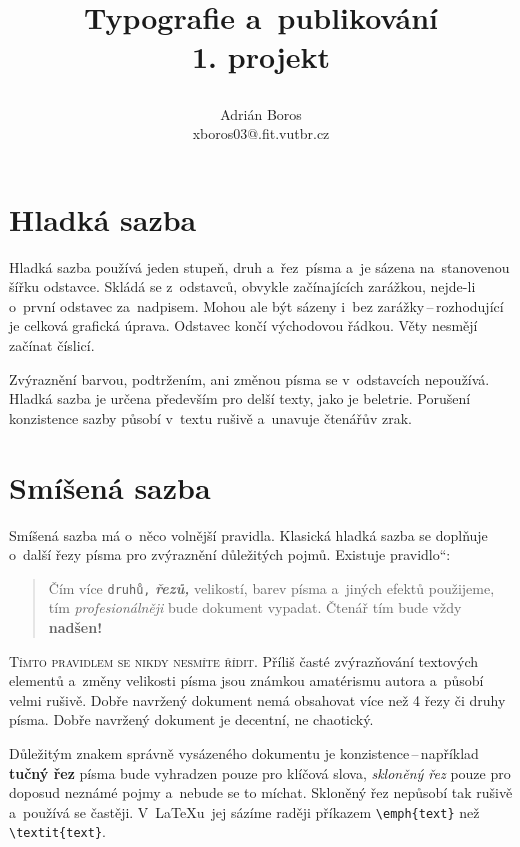 \documentclass[a4paper, 10 pt, twocolumn]{article}
\date{}
\newcommand{\myuv}[1]{\quotedblbase #1\textquotedblleft}
\begin{document}
\title{Typografie a~publikování \\
{\large 1. projekt}
\author{Adrián Boros \\ xboros03@.fit.vutbr.cz}}
\maketitle

\section{Hladká sazba}
Hladká sazba používá jeden stupeň, druh a~řez~písma a~je sázena na~stanovenou šířku odstavce. Skládá se z~odstavců, obvykle začínajících zarážkou, nejde-li o~první odstavec za~nadpisem. Mohou ale být sázeny i~bez zarážky\,--\,rozhodující je celková grafická úprava. Odstavec končí východovou řádkou. Věty nesmějí začínat číslicí.

Zvýraznění barvou, podtržením, ani změnou písma se v~odstavcích nepoužívá. Hladká sazba je určena především pro delší texty, jako je beletrie. Porušení konzistence sazby působí v~textu rušivě a~unavuje čtenářův zrak.

\section{Smíšená sazba}
\label{sec:2}
Smíšená sazba má o~něco volnější pravidla. Klasická hladká sazba se doplňuje o~další řezy písma pro zvýraznění důležitých pojmů. 
Existuje \myuv{pravidlo}:

\begin{quotation}
Čím více \texttt{druhů,} \textbf{\emph{řezů,}} {\small velikostí}, barev písma {\selectfont a~jiných efektů} použijeme, tím \emph{profesionálněji} bude dokument vypadat. Čtenář tím {\tiny bude} vždy \textbf{\huge nadšen!}
\end{quotation}

\textsc{Tímto pravidlem se nikdy nesmíte řídit}. Příliš časté zvýrazňování textových elementů a~změny velikosti písma jsou známkou amatérismu autora a~působí velmi rušivě. Dobře navržený dokument nemá obsahovat více než
4 řezy či druhy písma. Dobře navržený dokument je decentní, ne chaotický.

Důležitým znakem správně vysázeného dokumentu je konzistence\,--\,například \textbf{tučný řez} písma bude vyhradzen pouze pro klíčová slova, \emph{skloněný řez} pouze pro doposud neznámé pojmy a~nebude se to míchat. Skloněný řez nepůsobí tak rušivě a~používá se častěji. V~{\LaTeX}u~jej sázíme raději příkazem \verb|\emph{text}| než \verb|\textit{text}|.
\end{document}
